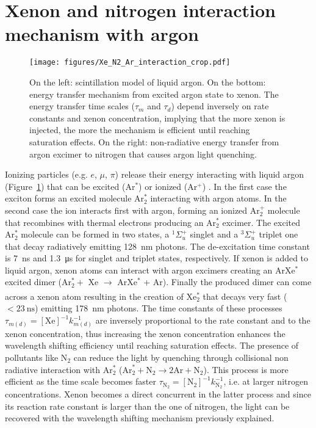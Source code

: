 \documentclass[a4paper]{article}
\begin{document}
\section{Xenon and nitrogen interaction mechanism with argon}
\begin{figure}
\begin{center}
\texttt{[image: figures/Xe\_N2\_Ar\_interaction\_crop.pdf]}\hspace{6mm}%
\begin{minipage}[b]{0.4\textwidth}
    \caption{\label{fig:Xe-tranfer} On the left: scintillation model of liquid argon. On the bottom: energy transfer mechanism from excited argon state to xenon. The energy transfer time scales ($\tau_m$ and $\tau_d$) depend inversely on rate constants and xenon concentration, implying that the more xenon is injected, the more the mechanism is efficient until reaching saturation effects. On the right: non-radiative energy transfer from argon excimer to nitrogen that causes argon light quenching.}
    \vspace{-4mm}
\end{minipage}
\end{center}
\end{figure}
Ionizing particles (e.g. $e$, $\mu$, $\pi$) release their energy interacting with liquid argon (Figure~\ref{fig:Xe-tranfer}) that can be excited (Ar$^*$) or ionized (Ar$^+$) \cite{PhysRevD.103.043001}. In the first case the exciton forms an excited molecule Ar$_2^*$ interacting with argon atoms. In the second case the ion interacts first with argon, forming an ionized Ar$_2^+$ molecule that recombines with thermal electrons producing an Ar$_2^*$ excimer. The excited Ar$_2^*$ molecule can be formed in two states, a $^1\Sigma_u^+$ singlet and a $^3\Sigma_u^+$ triplet one that decay radiatively emitting \SI{128}{\nano\meter} photons. The de-excitation time constant is \SI{7}{\nano\second} and \SI{1.3}{\micro\second} for singlet and triplet states, respectively. If xenon is added to liquid argon, xenon atoms can interact with argon excimers creating an ArXe$^*$ excited dimer (Ar$_2^* + $ Xe $\xrightarrow[]{}$ ArXe$^*$ + Ar). Finally the produced dimer can come across a xenon atom resulting in the creation of Xe$_2^*$ that decays very fast ($<\SI{23}{\nano\second}$) emitting \SI{178}{\nano\meter} photons. The time constants of these processes $\tau_{m(d)} = [\text{Xe}]^{-1} k_{m(d)}^{-1}$ are inversely proportional to the rate constant \cite{Buzulutskov:2017wau} and to the xenon concentration, thus increasing the xenon concentration enhances the wavelength shifting efficiency until reaching saturation effects. The presence of pollutants like N$_2$ can reduce the light by quenching through collisional non radiative interaction with Ar$_2^*$ ($\text{Ar}_2^* + \text{N}_2 \xrightarrow{} 2 \text{Ar} + \text{N}_2$). This process is more efficient as the time scale becomes faster $\tau_{\text{N}_2} = [\text{N}_2]^{-1} k_{\text{N}_2}^{-1}$, i.e. at larger nitrogen concentrations. Xenon becomes a direct concurrent in the latter process and since its reaction rate constant is larger than the one of nitrogen, the light can be recovered with the wavelength shifting mechanism previously explained.
\end{document}
